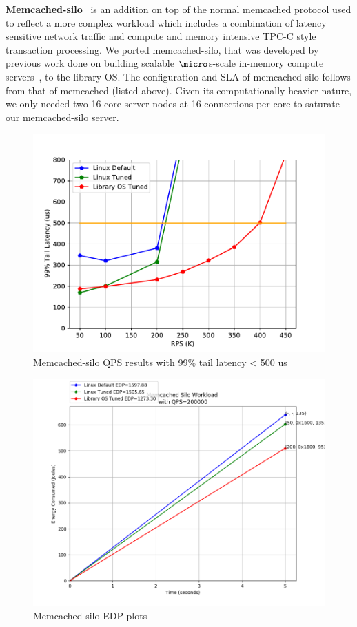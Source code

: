 \documentclass[pageno]{jpaper}
\begin{document}
\textbf{Memcached-silo}~\cite{mcdsilo} is an addition on top of the normal memcached protocol used to reflect a more complex workload which includes a combination of latency sensitive network traffic and compute and memory intensive TPC-C style transaction processing. We ported memcached-silo, that was developed by previous work done on building scalable $\micro$s-scale in-memory compute servers~\cite{zygos}, to the library OS. The configuration and SLA of memcached-silo follows from that of memcached (listed above). Given its computationally heavier nature, we only needed two 16-core server nodes at 16 connections per core to saturate our memcached-silo server.
\begin{figure}
	\includegraphics[width=\columnwidth]{asplos2021_figures/mcdsilo_sla.pdf}
	\caption{Memcached-silo QPS results with 99\% tail latency < 500 us}
\end{figure}
\begin{figure}
	\includegraphics[width=\columnwidth]{asplos2021_figures/mcdsilo_edp_aggregated_qps200000.png}
	\caption{Memcached-silo EDP plots}
\end{figure}
\end{document}

